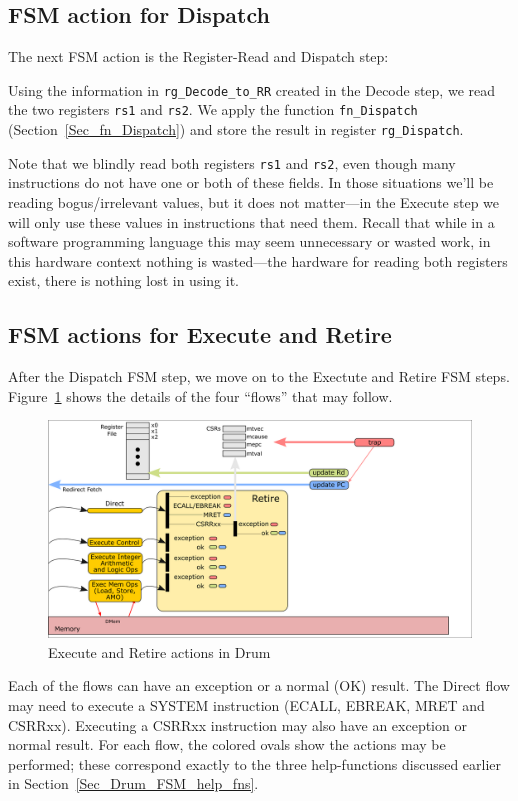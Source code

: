 \subsection{FSM action for Dispatch}

The next FSM action is the Register-Read and Dispatch step:



Using the information in \verb|rg_Decode_to_RR| created in the Decode
step, we read the two registers \verb|rs1| and \verb|rs2|.  We apply
the function \verb|fn_Dispatch| (Section~\ref{Sec_fn_Dispatch}) and
store the result in register \verb|rg_Dispatch|.

Note that we blindly read both registers \verb|rs1| and \verb|rs2|,
even though many instructions do not have one or both of these fields.
In those situations we'll be reading bogus/irrelevant values, but it
does not matter---in the Execute step we will only use these values in
instructions that need them. Recall that while in a software
programming language this may seem unnecessary or wasted work, in this
hardware context nothing is wasted---the hardware for reading both
registers exist, there is nothing lost in using it.


\subsection{FSM actions for Execute and Retire}

After the Dispatch FSM step, we move on to the Exectute and Retire FSM
steps.  Figure~\ref{Fig_Retire_Drum} shows the details of the four
``flows'' that may follow.
\begin{figure}[htbp]
  \centerline{\includegraphics[width=6in,angle=0]{Figures/Fig_Retire_Layers_1}}
  \caption{\label{Fig_Retire_Drum}Execute and Retire actions in Drum}
\end{figure}
Each of the flows can have an exception or a normal (OK) result.  The
Direct flow may need to execute a SYSTEM instruction (ECALL, EBREAK,
MRET and CSRRxx).  Executing a CSRRxx instruction may also have an
exception or normal result.  For each flow, the colored ovals show the
actions may be performed; these correspond exactly to the three
help-functions discussed earlier in Section~\ref{Sec_Drum_FSM_help_fns}.

